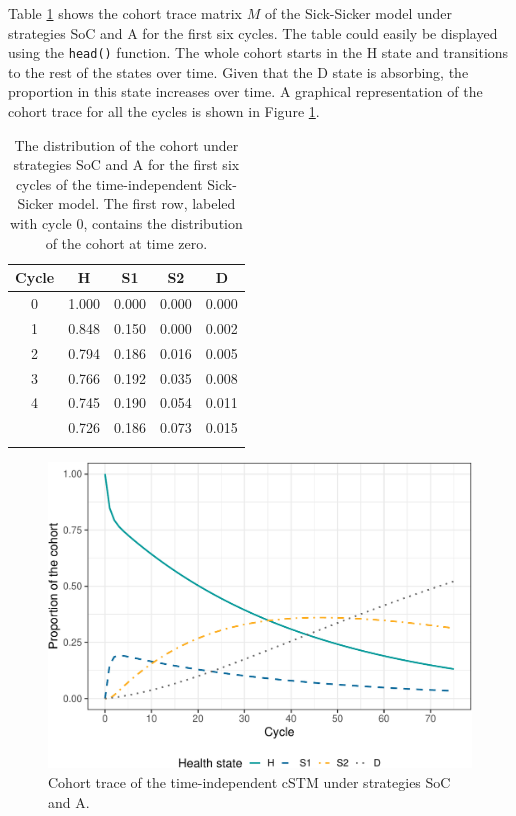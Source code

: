 \documentclass[
]{article}
\begin{document}
Table \ref{tab:Trace} shows the cohort trace matrix \(M\) of the Sick-Sicker model under strategies SoC and A for the first six cycles. The table could easily be displayed using the \texttt{head()} function. The whole cohort starts in the H state and transitions to the rest of the states over time. Given that the D state is absorbing, the proportion in this state increases over time. A graphical representation of the cohort trace for all the cycles is shown in Figure \ref{fig:Sick-Sicker-Trace-TimeHom}.

\begin{table}[!h]

\caption{\label{tab:Trace}The distribution of the cohort under strategies SoC and A for the first six cycles of the time-independent Sick-Sicker model. The first row, labeled with cycle 0, contains the distribution of the cohort at time zero.}
\centering
\begin{tabular}[t]{ccccc}
\toprule{}
Cycle & H & S1 & S2 & D\\
\midrule{}
0 & 1.000 & 0.000 & 0.000 & 0.000\\
1 & 0.848 & 0.150 & 0.000 & 0.002\\
2 & 0.794 & 0.186 & 0.016 & 0.005\\
3 & 0.766 & 0.192 & 0.035 & 0.008\\
4 & 0.745 & 0.190 & 0.054 & 0.011\\
\addlinespace
5 & 0.726 & 0.186 & 0.073 & 0.015\\
\bottomrule{}
\end{tabular}
\end{table}

\begin{figure}[H]

{\centering \includegraphics{figs/Sick-Sicker-Trace-TimeHom-1} 

}

\caption{Cohort trace of the time-independent cSTM under strategies SoC and A.}\label{fig:Sick-Sicker-Trace-TimeHom}
\end{figure}
\end{document}
